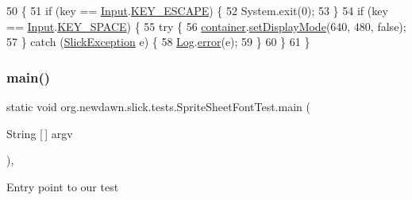 \begin{DoxyCode}
50                                            \{
51       \textcolor{keywordflow}{if} (key == \mbox{\hyperlink{classorg_1_1newdawn_1_1slick_1_1_input}{Input}}.\mbox{\hyperlink{classorg_1_1newdawn_1_1slick_1_1_input_a4b0638c1685678febcd71760564b0e37}{KEY\_ESCAPE}}) \{
52          System.exit(0);
53       \}
54       \textcolor{keywordflow}{if} (key == \mbox{\hyperlink{classorg_1_1newdawn_1_1slick_1_1_input}{Input}}.\mbox{\hyperlink{classorg_1_1newdawn_1_1slick_1_1_input_ae9b39721a7b669da9c87454285cb7c5f}{KEY\_SPACE}}) \{
55          \textcolor{keywordflow}{try} \{
56             \mbox{\hyperlink{classorg_1_1newdawn_1_1slick_1_1tests_1_1_sprite_sheet_font_test_a815648868b0f6ece0eb2952a1faeaedf}{container}}.\mbox{\hyperlink{classorg_1_1newdawn_1_1slick_1_1_app_game_container_aa2de68db61ddd3917a8edc0177ebdfe3}{setDisplayMode}}(640, 480, \textcolor{keyword}{false});
57          \} \textcolor{keywordflow}{catch} (\mbox{\hyperlink{classorg_1_1newdawn_1_1slick_1_1_slick_exception}{SlickException}} e) \{
58             \mbox{\hyperlink{classorg_1_1newdawn_1_1slick_1_1util_1_1_log}{Log}}.\mbox{\hyperlink{classorg_1_1newdawn_1_1slick_1_1util_1_1_log_af7c392bb99b0afd00b28d89fffd70a11}{error}}(e);
59          \}
60       \}
61    \}
\end{DoxyCode}
\mbox{\label{classorg_1_1newdawn_1_1slick_1_1tests_1_1_sprite_sheet_font_test_a8cad85695029d94b1c04689802d82ada}} 
\subsubsection{\texorpdfstring{main()}{main()}}
{\footnotesize\ttfamily static void org.\+newdawn.\+slick.\+tests.\+Sprite\+Sheet\+Font\+Test.\+main (\begin{DoxyParamCaption}\item[{String \mbox{[}$\,$\mbox{]}}]{argv }\end{DoxyParamCaption})\hspace{0.3cm}{\ttfamily [inline]}, {\ttfamily [static]}}

Entry point to our test


